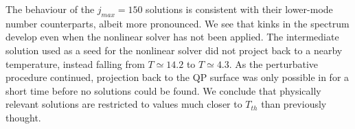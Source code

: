 \documentclass[../PhD.tex]{subfiles}
\begin{document}
\begin{subappendices}
The behaviour of the $j_{max}=150$ solutions is consistent with their lower-mode number counterparts, albeit more pronounced. We see that kinks in the spectrum develop even when the nonlinear solver has not been applied. The intermediate solution used as a seed for the nonlinear solver did not project back to a nearby temperature, instead falling from $T \simeq 14.2$ to $T \simeq 4.3$. As the perturbative procedure continued, projection back to the QP surface was only possible in for a short time before no solutions could be found. We conclude that physically relevant solutions are restricted to values much closer to $T_{th}$ than previously thought.

\end{subappendices}

\end{document}
